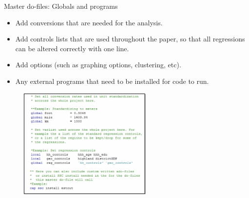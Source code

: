 \documentclass[aspectratio=169]{beamer}
\begin{document}
\begin{frame}[fragile]{Master do-files: Globals and programs}
\begin{multicols}{2}	
	
	\begin{itemize}[<default overlay specification>]
		\item<1> Add conversions that are needed for the analysis.
		\item<1> Add controls lists that are used throughout the paper, so that all regressions can be altered correctly with one line.
		\item<1>  Add options (such as graphing options, clustering, etc). 
		\item<1>  Any external programs that need to be installed for code to run.
	\end{itemize}
	
	\begin{figure}
		\centering
		\includegraphics[height=55mm]{img/Structure16}
	\end{figure}
	
\end{multicols}
\end{frame}
\end{document}
